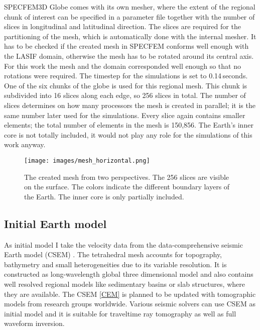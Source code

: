SPECFEM3D Globe comes with its own mesher, where the extent of the regional chunk of interest can be 
specified in a parameter file together with the number of slices in longitudinal and latitudinal direction.
The slices are required for the partitioning of the mesh, which is automatically done with the internal mesher.
It has to be checked if the created mesh in SPECFEM conforms well enough with the LASIF domain, 
otherwise the mesh has to be rotated around its central axis.
For this work the mesh and the domain corresponded well enough so that no rotations were required.
The timestep for the simulations is set to 0.14$\,$seconds.  
One of the six chunks of the globe is used for this regional mesh.
This chunk is subdivided into 16 slices along each edge, so 256 slices in total.
The number of slices determines on how many processors the mesh is created in parallel; 
it is the same number later used for the simulations. 
Every slice again contains smaller elements; the total number of elements in the mesh 
is 150,856. The Earth's inner core is not totally included, it would not play any role
for the simulations of this work anyway.

\begin{figure}[h]
\begin{center}
\texttt{[image: images/mesh\_horizontal.png]}
\caption{The created mesh from two perspectives. The 256 slices are visible on the surface.
The colors indicate the different boundary layers of the Earth. The inner core is only partially
included. }
\label{mesh}
\end{center}
\end{figure}


\subsection{Initial Earth model}

As initial model I take the velocity data from the data-comprehensive seismic Earth model (CSEM) \citep{Afanasiev2014}.
The tetrahedral mesh accounts for topography, bathymetry and small heterogeneities due to its variable resolution.
It is constructed as long-wavelength global three dimensional model and also contains well resolved regional models
like sedimentary basins or slab structures, where they are available.
The CSEM \autoref{CEM} is planned to be updated with tomographic models from research groups worldwide.
Various seismic solvers can use CSEM as initial model and it is suitable for traveltime ray tomography as well as
full waveform inversion.

